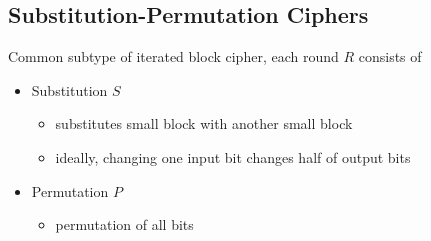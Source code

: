 \documentclass[draft]{article}
\begin{document}
\subsection{Substitution-Permutation Ciphers}
Common subtype of iterated block cipher, each round $R$ consists of
\begin{itemize}[nosep]
    \item Substitution $S$
          \begin{itemize}[nosep]
              \item substitutes small block with another small block
              \item ideally, changing one input bit changes half of output bits
          \end{itemize}
    \item Permutation $P$
          \begin{itemize}[nosep]
              \item permutation of all bits
          \end{itemize}
\end{itemize}
\end{document}

